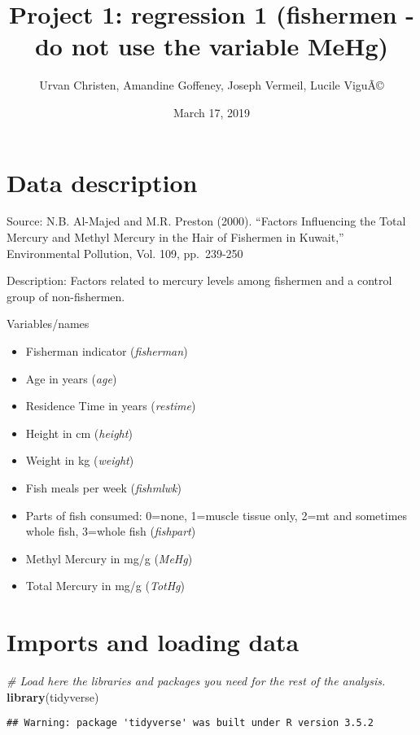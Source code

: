 \documentclass[12pt,]{article}
\title{Project 1: regression 1 (fishermen - do not use the variable MeHg)}
\author{Urvan Christen, Amandine Goffeney, Joseph Vermeil, Lucile ViguÃ©}
\date{March 17, 2019}
\newenvironment{Shaded}{\begin{snugshade}}{\end{snugshade}}
\newcommand{\KeywordTok}[1]{\textcolor[rgb]{0.13,0.29,0.53}{\textbf{#1}}}
\newcommand{\CommentTok}[1]{\textcolor[rgb]{0.56,0.35,0.01}{\textit{#1}}}
\newcommand{\NormalTok}[1]{#1}
\providecommand{\tightlist}{%
  \setlength{\itemsep}{0pt}\setlength{\parskip}{0pt}}
\begin{document}
\maketitle

\section{Data description}\label{data-description}

Source: N.B. Al-Majed and M.R. Preston (2000). ``Factors Influencing the
Total Mercury and Methyl Mercury in the Hair of Fishermen in Kuwait,''
Environmental Pollution, Vol. 109, pp.~239-250

Description: Factors related to mercury levels among fishermen and a
control group of non-fishermen.

Variables/names

\begin{itemize}
\tightlist
\item
  Fisherman indicator (\emph{fisherman})
\item
  Age in years (\emph{age})
\item
  Residence Time in years (\emph{restime})
\item
  Height in cm (\emph{height})
\item
  Weight in kg (\emph{weight})
\item
  Fish meals per week (\emph{fishmlwk})
\item
  Parts of fish consumed: 0=none, 1=muscle tissue only, 2=mt and
  sometimes whole fish, 3=whole fish (\emph{fishpart})
\item
  Methyl Mercury in mg/g (\emph{MeHg})
\item
  Total Mercury in mg/g (\emph{TotHg})
\end{itemize}

\section{Imports and loading data}\label{imports-and-loading-data}

\begin{Shaded}
\begin{Highlighting}[]
\CommentTok{# Load here the libraries and packages you need for the rest of the analysis.}
\KeywordTok{library}\NormalTok{(tidyverse)}
\end{Highlighting}
\end{Shaded}

\begin{verbatim}
## Warning: package 'tidyverse' was built under R version 3.5.2
\end{verbatim}
\end{document}
